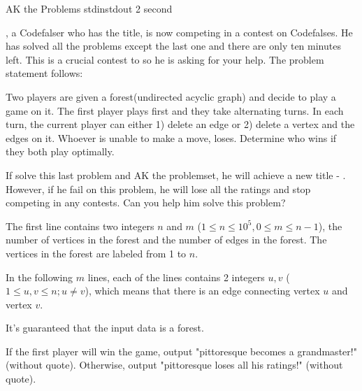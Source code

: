 
\begin{problem}{AK the Problems}
{stdin}{stdout}
{2 second}{}{}

\pittoresque, a Codefalser who has the \master title, is now competing in a contest on Codefalses. He has solved all the problems except the last one and there are only ten minutes left. This is a crucial contest to \pittoresque so he is asking for your help. The problem statement follows:

\par
Two players are given a forest(undirected acyclic graph) and decide to play a game on it. The first player plays first and they take alternating turns. In each turn, the current player can either 1) delete an edge or 2) delete a vertex and the edges on it. Whoever is unable to make a move, loses. Determine who wins if they both play optimally.

\par
If \pittoresque  solve this last problem and AK the problemset, he will achieve a new title - \grandmaster. However, if he fail on this problem, he will lose all the ratings and stop competing in any contests. Can you help him solve this problem? 

\InputFile

The first line contains two integers $n$ and $m$ ($1 \le n \le 10^5,0 \le m \le n-1 $), the number of vertices in the forest and the number of edges in the forest. The vertices in the forest are labeled from 1 to $n$.

In the following $m$ lines, each of the lines contains 2 integers $u, v$ ($1 \le u,v \le n; u \neq v$), which means that there is an edge connecting vertex $u$ and vertex $v$.

It's guaranteed that the input data is a forest.

\OutputFile

If the first player will win the game, output "pittoresque becomes a grandmaster!" (without quote). Otherwise, output "pittoresque loses all his ratings!" (without quote).

\Examples

\begin{example}
%
\end{example}

\end{problem}